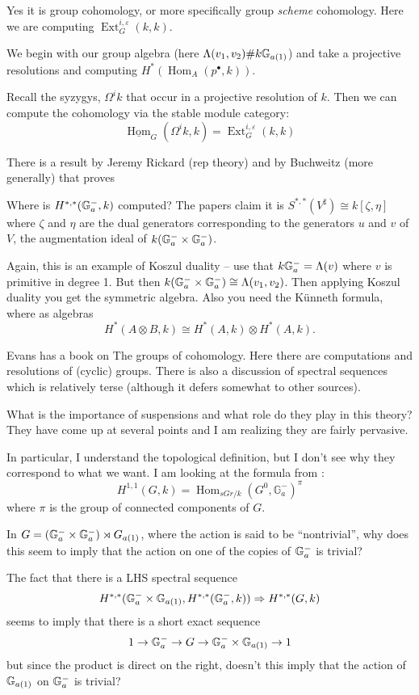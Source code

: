 \documentclass[12pt]{article}
\theoremstyle{nonumberbreak}
\theoremstyle{changebreak}
\theoremstyle{nonumberplain}
\theoremstyle{change}
\DeclareMathOperator{\Hom}{Hom}
\DeclareMathOperator{\Ext}{Ext}
\newcommand*{\bbG}{\ensuremath\mathbb{G}}
\begin{document}
Yes it is group cohomology, or more specifically group \textit{scheme} cohomology. Here we 
are computing $\Ext_G^{i,\varepsilon}(k,k)$.

We begin with our group algebra (here $\Lambda(v_1,v_2)\#k\bbG_{a(1)}$) and take 
a projective resolutions and computing $H^*(\Hom_A(p^\bullet,k))$.

Recall the syzygys, $\Omega^i k$ that occur in a projective resolution of $k$. Then we can compute the cohomology
via the stable module category:
\[\underline{\Hom}_G(\Omega^ik,k)=\Ext_G^{i,\varepsilon}(k,k)\]

There is a result by Jeremy Rickard (rep theory) and by Buchweitz (more generally) that proves

\begin{qst}
	Where is $H^{*,*}(\bbG_a^-,k)$ computed? The papers claim it is $S^{*,*}(V^\sharp)\cong k[\zeta,\eta]$
	where $\zeta$ and $\eta$ are the dual generators corresponding to the generators $u$ and $v$ of $V$,
	the augmentation ideal of $k(\bbG_a^-\times \bbG_a^-)$.
\end{qst}

Again, this is an example of Koszul duality -- use that $k\bbG_a^-=\Lambda(v)$ where $v$ is primitive in degree 1.
But then $k(\bbG_a^-\times\bbG_a^-)\cong\Lambda(v_1,v_2)$. Then applying Koszul duality you get the 
symmetric algebra. Also you need the K\"unneth formula, where as algebras
\[H^*(A\otimes B,k)\cong H^*(A,k)\otimes H^*(A,k).\]

Evans has a book on The groups of cohomology. Here there are computations and resolutions of (cyclic)
groups. There is also a discussion of spectral sequences which is relatively terse (although it defers
somewhat to other sources).

\begin{qst}
	What is the importance of suspensions and what role do they play in this theory? They 
	have come up at several points and I am realizing they are fairly pervasive. 

	In particular, I understand the topological definition, but I don't see why they correspond
	to what we want. I am looking at the formula from \cite{detecting-nilpotence}:
	\[H^{1,1}(G,k)=\Hom_{sGr/k}(G^0,\mathbb{G}_a^-)^\pi\]
	where $\pi$ is the group of connected components of $G$.
\end{qst}
	
\begin{qst}
	In $G=(\bbG_a^-\times\bbG_a^-)\rtimes G_{a(1)}$, where the action is said to be ``nontrivial'',
	why does this seem to imply that the action on one of the copies of $\bbG_a^-$ is trivial?

	The fact that there is a LHS spectral sequence 
	\[H^{*,*}(\bbG_a^-\times \bbG_{a(1)},H^{*,*}(\bbG_a^-,k))\Rightarrow H^{*,*}(G,k)\]
	seems to imply that there is a short exact sequence 
	\[1\to \bbG_a^-\to G\to \bbG_a^-\times \bbG_{a(1)}\to 1\]
	but since the product is direct on the right, doesn't this imply that the action of $\bbG_{a(1)}$ on 
	$\bbG_a^-$ is trivial?
\end{qst}
\end{document}
